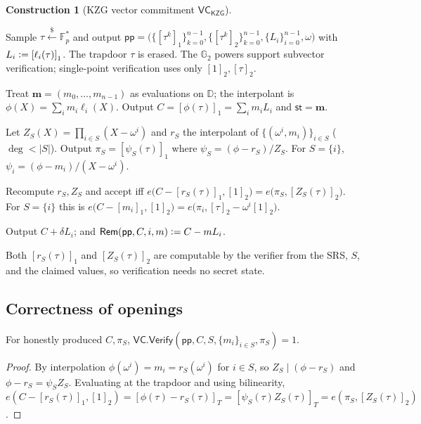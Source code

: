 \documentclass[version=preprint]{iacrcc}
\theoremstyle{definition}
\newtheorem{construction}{Construction}[section]
\newcommand{\secpar}{\lambda}
\newcommand{\sample}{\xleftarrow{\;\$\;}}
\newcommand{\defeq}{\vcentcolon=}
\newcommand{\Setup}{\mathsf{Setup}}
\newcommand{\Commit}{\mathsf{Commit}}
\newcommand{\Open}{\mathsf{Open}}
\newcommand{\Vfy}{\mathsf{Verify}}
\newcommand{\Update}{\mathsf{Update}}
\newcommand{\Rem}{\mathsf{Rem}}
\newcommand{\pp}{\mathsf{pp}}
\newcommand{\aux}{\mathsf{st}}
\newcommand{\VC}{\mathsf{VC}}
\newcommand{\GG}{\mathbb{G}}
\newcommand{\FF}{\mathbb{F}}
\newcommand{\gone}[1]{\left[#1\right]_{1}}
\newcommand{\gtwo}[1]{\left[#1\right]_{2}}
\newcommand{\gtt}[1]{\left[#1\right]_{T}}
\newcommand{\dom}{\mathbb{D}}
\newcommand{\lag}{\ell}
\newcommand{\Zpol}{Z}
\newcommand{\rpol}{r}
\begin{document}
\begin{construction}[KZG vector commitment $\VC_{\mathsf{KZG}}$]\label{con:vc}
\leavevmode
\begin{description}[leftmargin=0em,itemsep=4pt]
\item[$\VC.\Setup(1^\secpar,1^{n})$.] Sample $\tau\sample\FF_p^{*}$ and output
      $\pp=\big(\{\gone{\tau^{k}}\}_{k=0}^{n-1},\{\gtwo{\tau^{k}}\}_{k=0}^{n-1},
      \{L_i\}_{i=0}^{n-1},\omega\big)$ with $L_i\defeq\gone{\lag_i(\tau)}$. The
      trapdoor $\tau$ is erased. The $\GG_2$ powers support subvector
      verification; single-point verification uses only $\gtwo{1},\gtwo{\tau}$.
\item[$\VC.\Commit(\pp,\mathbf{m})$.] Treat $\mathbf{m}=(m_0,\dots,m_{n-1})$ as
      evaluations on $\dom$; the interpolant is $\phi(X)=\sum_i m_i\lag_i(X)$.
      Output $C=\gone{\phi(\tau)}=\sum_{i}m_i L_i$ and $\aux=\mathbf{m}$.
\item[$\VC.\Open(\pp,\aux,S)$.] Let $\Zpol_S(X)=\prod_{i\in S}(X-\omega^{i})$ and
      $\rpol_S$ the interpolant of $\{(\omega^{i},m_i)\}_{i\in S}$ ($\deg<|S|$).
      Output $\pi_S=\gone{\psi_S(\tau)}$ where
      $\psi_S=(\phi-\rpol_S)/\Zpol_S$. For $S=\{i\}$,
      $\psi_i=(\phi-m_i)/(X-\omega^{i})$.
\item[$\VC.\Vfy(\pp,C,S,\{m_i\}_{i\in S},\pi_S)$.] Recompute $\rpol_S,\Zpol_S$ and
      accept iff
      $e\big(C-\gone{\rpol_S(\tau)},\gtwo{1}\big)=e\big(\pi_S,\gtwo{\Zpol_S(\tau)}\big)$.
      For $S=\{i\}$ this is
      $e\big(C-\gone{m_i},\gtwo{1}\big)=e\big(\pi_i,\gtwo{\tau}-\omega^{i}\gtwo{1}\big)$.
\item[$\VC.\Update(\pp,C,i,\delta)$.] Output $C+\delta L_i$; and
      $\Rem(\pp,C,i,m)\defeq C-m L_i$.
\end{description}
\end{construction}

Both $\gone{\rpol_S(\tau)}$ and $\gtwo{\Zpol_S(\tau)}$ are computable by the
verifier from the SRS, $S$, and the claimed values, so verification needs no
secret state.

\subsection{Correctness of openings}

\begin{lemma}\label{lem:open}
For honestly produced $C,\pi_S$, $\VC.\Vfy(\pp,C,S,\{m_i\}_{i\in S},\pi_S)=1$.
\end{lemma}
\begin{proof}
By interpolation $\phi(\omega^{i})=m_i=\rpol_S(\omega^{i})$ for $i\in S$, so
$\Zpol_S\mid(\phi-\rpol_S)$ and $\phi-\rpol_S=\psi_S\Zpol_S$. Evaluating at the
trapdoor and using bilinearity,
$e(C-\gone{\rpol_S(\tau)},\gtwo{1})=\gtt{\phi(\tau)-\rpol_S(\tau)}
 =\gtt{\psi_S(\tau)\Zpol_S(\tau)}=e(\pi_S,\gtwo{\Zpol_S(\tau)})$.
\end{proof}
\end{document}
